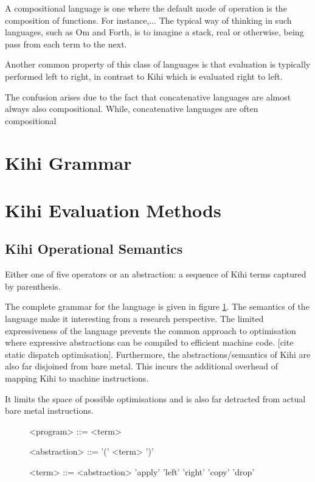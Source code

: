 A compositional language is one where the default mode of operation
is the composition of functions. For instance,...
The typical way of thinking in such languages, such as Om and Forth,
is to imagine a stack, real or otherwise, being pass from each term
to the next.

Another common property of this class of languages is that evaluation
is typically performed left to right, in contrast to Kihi which is
evaluated right to left.

The confusion arises due to the fact that concatenative languages are
almost always also compositional.
While, concatenative languages are often compositional 


\section{Kihi Grammar}

\section{Kihi Evaluation Methods}

\subsection{Kihi Operational Semantics}



Either
one of five operators or an abstraction: a sequence of Kihi terms
captured by parenthesis. 

The complete grammar for the language is given
in figure \ref{fig:grammar}. The semantics of the language make it
interesting from a research perspective. The limited expressiveness of
the language prevents the common approach to optimisation where expressive
abstractions can be compiled to efficient machine code. [cite static
dispatch optimisation]. Furthermore, the abstractions/semantics of Kihi are
also far disjoined from bare metal. This incurs the additional overhead of
mapping Kihi to machine instructions.

It limits the space of possible
optimisations and is also far detracted from actual bare metal instructions.


\begin{figure}[htb]       
    \centering
    \begin{grammar}
    <program> ::= { <term> }

    <abstraction> ::= '(' <term> ')'

    <term> ::= <abstraction>
        \alt 'apply'
        \alt 'left'
        \alt 'right'
        \alt 'copy'
        \alt 'drop'
    
      \end{grammar}
    \caption{}
    \label{fig:grammar}
\end{figure}



